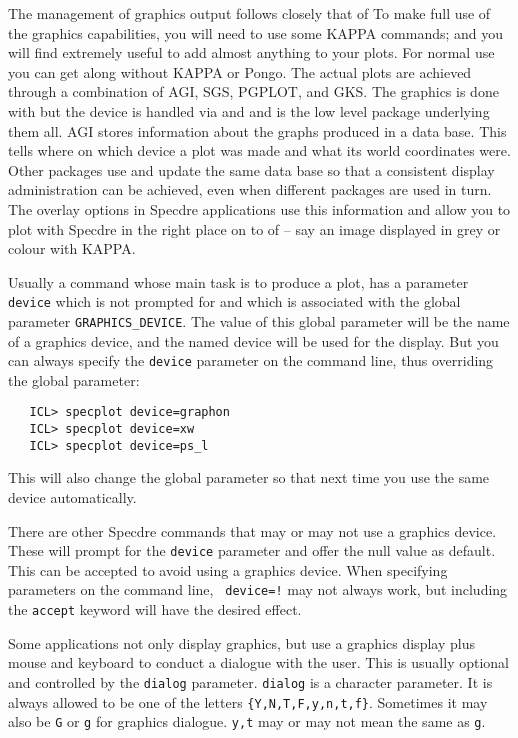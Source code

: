    The management of graphics output follows closely that of
   To make full use of the graphics capabilities, you will need to use
   some KAPPA commands; and you will find
   extremely useful to add almost anything to your plots.  For normal
   use you can get along without KAPPA or Pongo. The actual plots are
   achieved through a combination of AGI, SGS, PGPLOT, and GKS.
   The graphics is done with
   but the device is handled via
   and
   and
   is the low level package underlying them all.  AGI stores information
   about the graphs produced in a data base. This tells where on which
   device a plot was made and what its world coordinates were.  Other
   packages use and update the same data base so that a consistent
   display administration can be achieved, even when different packages
   are used in turn. The overlay options in Specdre applications use
   this information and allow you to plot with Specdre in the right
   place on to of -- say an image displayed in grey or colour with
   KAPPA.

   Usually a command whose main task is to produce a plot, has a
   parameter {\tt device} which is not prompted for and which is
   associated with the global parameter {\tt GRAPHICS\_DEVICE}. The
   value of this global parameter will be the name of a graphics device,
   and the named device will be used for the display. But you can always
   specify the {\tt device} parameter on the command line, thus
   overriding the global parameter:

\begin{verbatim}
   ICL> specplot device=graphon
   ICL> specplot device=xw
   ICL> specplot device=ps_l
\end{verbatim}

   This will also change the global parameter so that next time you use
   the same device automatically.

   There are other Specdre commands that may or may not use a graphics
   device. These will prompt for the {\tt device} parameter and offer
   the null value as default. This can be accepted to avoid using a
   graphics device. When specifying parameters on the command line, {\tt
   device=!} may not always work, but including the {\tt accept} keyword
   will have the desired effect.

   Some applications not only display graphics, but use a graphics
   display plus mouse and keyboard to conduct a dialogue with the user.
   This is usually optional and controlled by the {\tt dialog}
   parameter.  {\tt dialog} is a character parameter.  It is always
   allowed to be one of the letters {\tt\{Y,N,T,F,y,n,t,f\}}.  Sometimes
   it may also be {\tt G} or {\tt g} for graphics dialogue.  {\tt y,t}
   may or may not mean the same as {\tt g}.


